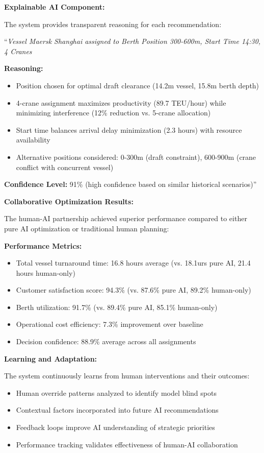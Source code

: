 \documentclass{article}
\begin{document}
\textbf{Explainable AI Component:}

The system provides transparent reasoning for each recommendation:

``\textit{Vessel Maersk Shanghai assigned to Berth Position 300-600m, Start Time 14:30, 4 Cranes}

\textbf{Reasoning:}
\begin{itemize}
\item Position chosen for optimal draft clearance (14.2m vessel, 15.8m berth depth)
\item 4-crane assignment maximizes productivity (89.7 TEU/hour) while minimizing interference (12\% reduction vs. 5-crane allocation)
\item Start time balances arrival delay minimization (2.3 hours) with resource availability
\item Alternative positions considered: 0-300m (draft constraint), 600-900m (crane conflict with concurrent vessel)
\end{itemize}

\textbf{Confidence Level:} 91\% (high confidence based on similar historical scenarios)''

\textbf{Collaborative Optimization Results:}

The human-AI partnership achieved superior performance compared to either pure AI optimization or traditional human planning:

\textbf{Performance Metrics:}
\begin{itemize}
\item Total vessel turnaround time: 16.8 hours average (vs. 18.1urs pure AI, 21.4 hours human-only)
\item Customer satisfaction score: 94.3\% (vs. 87.6\% pure AI, 89.2\% human-only)
\item Berth utilization: 91.7\% (vs. 89.4\% pure AI, 85.1\% human-only)
\item Operational cost efficiency: 7.3\% improvement over baseline
\item Decision confidence: 88.9\% average across all assignments
\end{itemize}

\textbf{Learning and Adaptation:}

The system continuously learns from human interventions and their outcomes:
\begin{itemize}
\item Human override patterns analyzed to identify model blind spots
\item Contextual factors incorporated into future AI recommendations
\item Feedback loops improve AI understanding of strategic priorities
\item Performance tracking validates effectiveness of human-AI collaboration
\end{itemize}
\end{document}
